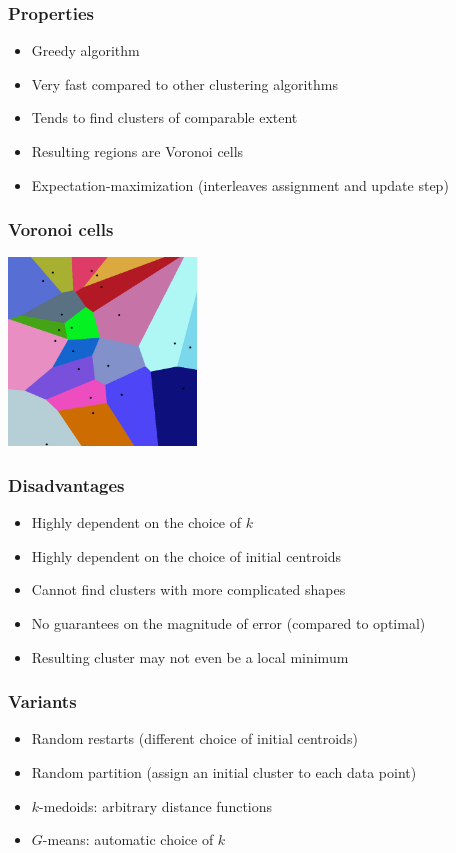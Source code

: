 \documentclass[10pt]{beamer}
\begin{document}
\begin{frame}
  \frametitle{Properties}
  \begin{itemize}
    \item Greedy algorithm
    \item Very fast compared to other clustering algorithms
    \item Tends to find clusters of comparable extent
	\item Resulting regions are {\color{red} Voronoi cells}
	\item Expectation-maximization (interleaves assignment and update step)
  \end{itemize}
\end{frame}

\begin{frame}
  \frametitle{Voronoi cells}
  \centerline{\includegraphics[height=5cm]{images/voronoi.png}}
\end{frame}

\begin{frame}
  \frametitle{Disadvantages}
  \begin{itemize}
    \item Highly dependent on the choice of $k$
    \item Highly dependent on the choice of initial centroids
	\item Cannot find clusters with more complicated shapes
	\item No guarantees on the magnitude of error (compared to optimal)
	\item Resulting cluster may not even be a local minimum
  \end{itemize}
\end{frame}

\begin{frame}
  \frametitle{Variants}
  \begin{itemize}
    \item Random restarts (different choice of initial centroids)
	\item Random partition (assign an initial cluster to each data point)
	\item $k$-medoids: arbitrary distance functions
	\item $G$-means: automatic choice of $k$
  \end{itemize}
\end{frame}
\end{document}
